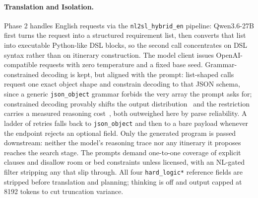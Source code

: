\documentclass{article}
\begin{document}
\paragraph{Translation and Isolation.}
Phase 2 handles English requests via the \texttt{nl2sl\_hybrid\_en}
pipeline: Qwen3.6-27B first turns the request into a structured requirement
list, then converts that list into executable Python-like DSL blocks, so
the second call concentrates on DSL syntax rather than on itinerary
construction. The model client issues OpenAI-compatible
requests with zero temperature and a fixed base seed. Grammar-constrained
decoding is kept, but aligned with the prompt: list-shaped calls request
one exact object shape and constrain decoding to that JSON schema, since a
generic \texttt{json\_object} grammar forbids the very array the prompt
asks for; constrained decoding provably shifts the output
distribution~\cite{gad} and the restriction carries a measured reasoning
cost~\cite{tam2024}, both outweighed here by parse reliability. A ladder of retries falls back to \texttt{json\_object} and then
to a bare payload whenever the endpoint rejects an optional field. Only the generated program is passed downstream: neither the model's
reasoning trace nor any itinerary it proposes reaches the search stage.
The prompts demand one-to-one coverage of explicit clauses and disallow
room or bed constraints unless licensed, with an NL-gated filter stripping
any that slip through. All four \texttt{hard\_logic*} reference fields are
stripped before translation and planning; thinking is off and output capped
at 8192 tokens to cut truncation variance.
 
\end{document}
